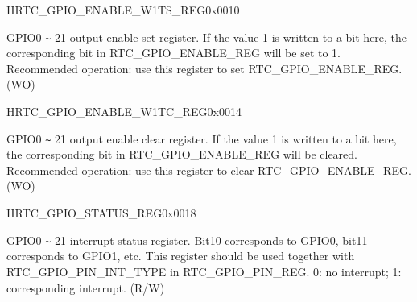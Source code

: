 \begin{register}{H}{RTC\_GPIO\_ENABLE\_W1TS\_REG}{0x{}0010}\label{regdesc:RTCIORTCGPIOENABLEW1TSREG}
%
%
\regnewline%
\begin{regdesc}\begin{reglist}
\label{fielddesc:RTCIOREGRTCIOREGGPIOENABLEW1TS}\item [RTC\_GPIO\_ENABLE\_W1TS] GPIO0 \verb+~+ 21 output enable set register. If the value 1 is written to a bit here, the corresponding bit in RTC\_GPIO\_ENABLE\_REG will be set to 1. Recommended operation: use this register to set RTC\_GPIO\_ENABLE\_REG. (WO)
\end{reglist}\end{regdesc}
\end{register}


\begin{register}{H}{RTC\_GPIO\_ENABLE\_W1TC\_REG}{0x{}0014}\label{regdesc:RTCIORTCGPIOENABLEW1TCREG}
%
%
\regnewline%
\begin{regdesc}\begin{reglist}
\label{fielddesc:RTCIOREGRTCIOREGGPIOENABLEW1TC}\item [RTC\_GPIO\_ENABLE\_W1TC] GPIO0 \verb+~+ 21 output enable clear register. If the value 1 is written to a bit here, the corresponding bit in RTC\_GPIO\_ENABLE\_REG will be cleared. Recommended operation: use this register to clear RTC\_GPIO\_ENABLE\_REG. (WO)
\end{reglist}\end{regdesc}
\end{register}


\begin{register}{H}{RTC\_GPIO\_STATUS\_REG}{0x{}0018}\label{regdesc:RTCIORTCGPIOSTATUSREG}
%
%
\regnewline%
\begin{regdesc}\begin{reglist}
\label{fielddesc:RTCIOGPIOSTATUSINT}\item [RTC\_GPIO\_STATUS\_INT] GPIO0 \verb+~+ 21 interrupt status register. Bit10 corresponds to GPIO0, bit11 corresponds to GPIO1, etc. This register should be used together with RTC\_GPIO\_PIN\_INT\_TYPE in RTC\_GPIO\_PIN\_REG. 0: no interrupt; 1: corresponding interrupt. (R/W)
\end{reglist}\end{regdesc}
\end{register}


